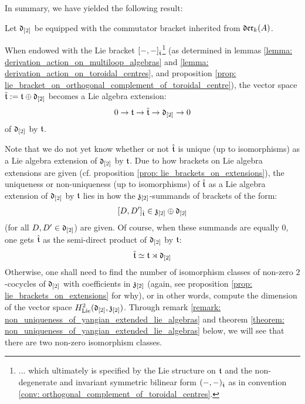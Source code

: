         In summary, we have yielded the following result:
        \begin{theorem} \label{theorem: extended_toroidal_lie_algebras}
            Let $\mathfrak{d}_{[2]}$ be equipped with the commutator bracket inherited from $\mathfrak{der}_k(A)$.
        
            When endowed with the Lie bracket $[-, -]_{\hat{\mathfrak{t}}}$\footnote{... which ultimately is specified by the Lie structure on $\mathfrak{t}$ and the non-degenerate and invariant symmetric bilinear form $(-, -)_{\hat{\mathfrak{t}}}$ as in convention \ref{conv: orthogonal_complement_of_toroidal_centres}.} (as determined in lemmas \ref{lemma: derivation_action_on_multiloop_algebras} and \ref{lemma: derivation_action_on_toroidal_centres}, and proposition \ref{prop: lie_bracket_on_orthogonal_complement_of_toroidal_centre}), the vector space $\hat{\mathfrak{t}} := \mathfrak{t} \oplus \mathfrak{d}_{[2]}$ becomes a Lie algebra extension:
                $$0 \to \mathfrak{t} \to \hat{\mathfrak{t}} \to \mathfrak{d}_{[2]} \to 0$$
            of $\mathfrak{d}_{[2]}$ by $\mathfrak{t}$. 
        \end{theorem}
        \begin{remark}
            Note that we do not yet know whether or not $\hat{\mathfrak{t}}$ is unique (up to isomorphisms) as a Lie algebra extension of $\mathfrak{d}_{[2]}$ by $\mathfrak{t}$. Due to how brackets on Lie algebra extensions are given (cf. proposition \ref{prop: lie_brackets_on_extensions}), the uniqueness or non-uniqueness (up to isomorphisms) of $\hat{\mathfrak{t}}$ as a Lie algebra extension of $\mathfrak{d}_{[2]}$ by $\mathfrak{t}$ lies in how the $\mathfrak{z}_{[2]}$-summands of brackets of the form:
                $$[D, D']_{\hat{\mathfrak{t}}} \in \mathfrak{z}_{[2]} \oplus \mathfrak{d}_{[2]}$$
            (for all $D, D' \in \mathfrak{d}_{[2]}$) are given. Of course, when these summands are equally $0$, one gets $\hat{\mathfrak{t}}$ as the semi-direct product of $\mathfrak{d}_{[2]}$ by $\mathfrak{t}$:
                $$\hat{\mathfrak{t}} \simeq \mathfrak{t} \rtimes \mathfrak{d}_{[2]}$$
            Otherwise, one shall need to find the number of isomorphism classes of non-zero $2$-cocycles of $\mathfrak{d}_{[2]}$ with coefficients in $\mathfrak{z}_{[2]}$ (again, see proposition \ref{prop: lie_brackets_on_extensions} for why), or in other words, compute the dimension of the vector space $H^2_{\mathrm{Lie}}(\mathfrak{d}_{[2]}, \mathfrak{z}_{[2]})$. Through remark \ref{remark: non_uniqueness_of_yangian_extended_lie_algebras} and theorem \ref{theorem: non_uniqueness_of_yangian_extended_lie_algebras} below, we will see that there are two non-zero isomorphism classes.
        \end{remark}
